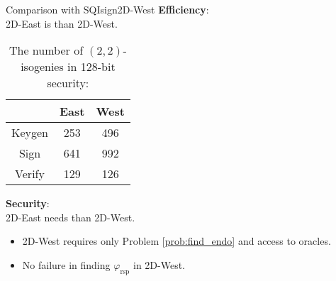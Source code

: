 \begin{frame}{Comparison with SQIsign2D-West}
    \textbf{Efficiency}:\\
    2D-East is  than 2D-West. \\[-10pt]
    \begin{table}
        \caption{The number of $(2, 2)$-isogenies in 128-bit security:}
        \begin{center}
            \begin{tabular}{c|c|c}
                & East & West \\\hline
                Keygen & 253 & 496 \\
                Sign & 641 & 992 \\
                Verify & 129 & 126
            \end{tabular}
        \end{center}
    \end{table}

    \vspace{10pt}
    \textbf{Security}:\\
    2D-East needs  than 2D-West. 
    \begin{itemize}
        \item 2D-West requires only Problem \ref{prob:find_endo}
            and access to oracles.
        \item No failure in finding $\varphi_\mathrm{rsp}$ in 2D-West.
    \end{itemize}
\end{frame}